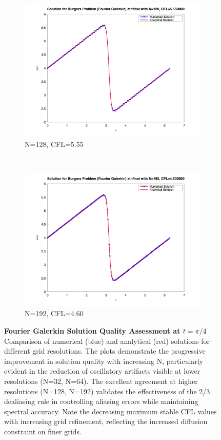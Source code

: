 \begin{figure}[H]
\begin{subfigure}{0.5\textwidth}
		\includegraphics[width=\textwidth]{media/burger_tfinal_fg_128.png}
		\caption{N=128, CFL=5.55}
		\label{sfig:galerkin_n128}
	\end{subfigure}%
	~
	\begin{subfigure}{0.5\textwidth}
		\includegraphics[width=\textwidth]{media/burger_tfinal_fg_192.png}
		\caption{N=192, CFL=4.60}
		\label{sfig:galerkin_n192}
	\end{subfigure}
	\caption{\textbf{Fourier Galerkin Solution Quality Assessment at $t = \pi/4$}
		Comparison of numerical (blue) and analytical (red) solutions for different grid resolutions. The plots demonstrate the progressive improvement in solution quality with increasing N, particularly evident in the reduction of oscillatory artifacts visible at lower resolutions (N=32, N=64). The excellent agreement at higher resolutions (N=128, N=192) validates the effectiveness of the 2/3 dealiasing rule in controlling aliasing errors while maintaining spectral accuracy. Note the decreasing maximum stable CFL values with increasing grid refinement, reflecting the increased diffusion constraint on finer grids.
	}
	\label{fig:galerkin_solutions}
\end{figure}

